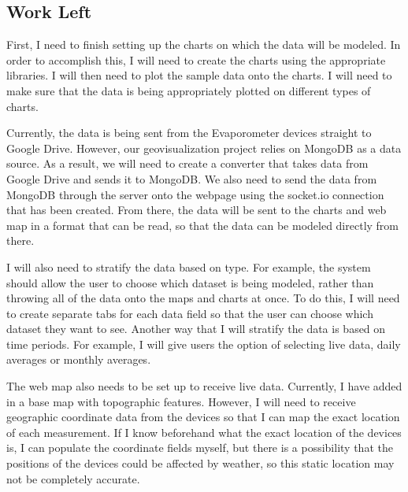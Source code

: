 \documentclass[onecolumn, draftclsnofoot,10pt, compsoc]{IEEEtran}
\begin{document}
\subsection{Work Left}
 First, I need to finish setting up the charts on which the data will be modeled. In order to accomplish this, I will need to create the charts using the appropriate libraries. I will then need to plot the sample data onto the charts. I will need to make sure that the data is being appropriately plotted on different types of charts.
 
 
Currently, the data is being sent from the Evaporometer devices straight to Google Drive. However, our geovisualization project relies on MongoDB as a data source. As a result, we will need to create a converter that takes data from Google Drive and sends it to MongoDB. We also need to send the data from MongoDB through the server onto the webpage using the socket.io connection that has been created. From there, the data will be sent to the charts and web map in a format that can be read, so that the data can be modeled directly from there. 


I will also need to stratify the data based on type. For example, the system should allow the user to choose which dataset is being modeled, rather than throwing all of the data onto the maps and charts at once. To do this, I will need to create separate tabs for each data field so that the user can choose which dataset they want to see. Another way that I will stratify the data is based on time periods. For example, I will give users the option of selecting live data, daily averages or monthly averages.


The web map also needs to be set up to receive live data. Currently, I have added in a base map with topographic features. However, I will need to receive geographic coordinate data from the devices so that I can map the exact location of each measurement. If I know beforehand what the exact location of the devices is, I can populate the coordinate fields myself, but there is a possibility that the positions of the devices could be affected by weather, so this static location may not be completely accurate.
\end{document}
